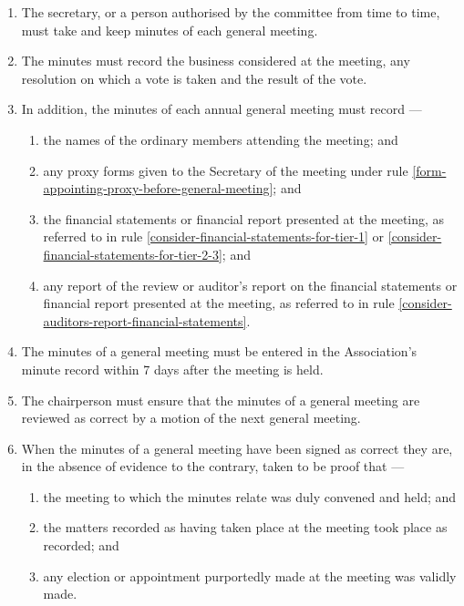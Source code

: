 \documentclass[../constitution.tex]{subfiles}
\begin{document}
\begin{enumerate}

\item The secretary, or a person authorised by the committee from time to time, must take and keep minutes of each general meeting.
\item The minutes must record the business considered at the meeting, any resolution on which a vote is taken and the result of the vote.
\item In addition, the minutes of each annual general meeting must record ---

  \begin{enumerate}
  
  \item the names of the ordinary members attending the meeting; and
  \item any proxy forms given to the Secretary of the meeting under rule \ref{form-appointing-proxy-before-general-meeting}; and
  \item the financial statements or financial report presented at the meeting, as referred to in rule \ref{consider-financial-statements-for-tier-1} or \ref{consider-financial-statements-for-tier-2-3}; and
  \item any report of the review or auditor's report on the financial statements or financial report presented at the meeting, as referred to in rule \ref{consider-auditors-report-financial-statements}.
  \end{enumerate}
\item The minutes of a general meeting must be entered in the Association's minute record within 7 days  after the meeting is held.
\item The chairperson must ensure that the minutes of a general meeting are reviewed as correct by a motion of the next general meeting. 
\item When the minutes of a general meeting have been signed  as correct they are, in the absence of evidence to the contrary, taken to be proof that ---

  \begin{enumerate}
  
  \item the meeting to which the minutes relate was duly convened and held; and
  \item the matters recorded as having taken place at the meeting took place as recorded; and
  \item any election or appointment purportedly made at the meeting was validly made.
  \end{enumerate}
\end{enumerate}
\end{document}
